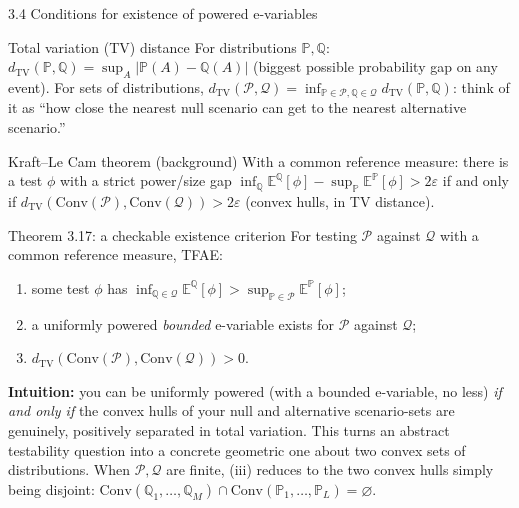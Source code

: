 \documentclass[aspectratio=169,10pt]{beamer}
\newcommand{\PP}{\mathbb{P}}
\newcommand{\QQ}{\mathbb{Q}}
\newcommand{\EE}{\mathbb{E}}
\newcommand{\calP}{\mathcal{P}}
\newcommand{\calQ}{\mathcal{Q}}
\begin{document}
\begin{frame}[allowframebreaks]{3.4 Conditions for existence of powered e-variables}
  \begin{block}{Total variation (TV) distance}
    For distributions $\PP,\QQ$: $d_{\mathrm{TV}}(\PP,\QQ) = \sup_A |\PP(A)-\QQ(A)|$ (biggest possible probability gap on any event). For sets of distributions, $d_{\mathrm{TV}}(\calP,\calQ) = \inf_{\PP\in\calP,\QQ\in\calQ} d_{\mathrm{TV}}(\PP,\QQ)$: think of it as ``how close the nearest null scenario can get to the nearest alternative scenario.''
  \end{block}

  \begin{block}{Kraft--Le Cam theorem (background)}
    With a common reference measure: there is a test $\phi$ with a strict power/size gap $\inf_\QQ \EE^\QQ[\phi] - \sup_\PP\EE^\PP[\phi] > 2\varepsilon$ if and only if $d_{\mathrm{TV}}(\mathrm{Conv}(\calP),\mathrm{Conv}(\calQ)) > 2\varepsilon$ (convex hulls, in TV distance).
  \end{block}

  \begin{block}{Theorem 3.17: a checkable existence criterion}
    For testing $\calP$ against $\calQ$ with a common reference measure, TFAE:
    \begin{enumerate}
      \item[(i)] some test $\phi$ has $\inf_{\QQ\in\calQ}\EE^\QQ[\phi] > \sup_{\PP\in\calP}\EE^\PP[\phi]$;
      \item[(ii)] a uniformly powered \emph{bounded} e-variable exists for $\calP$ against $\calQ$;
      \item[(iii)] $d_{\mathrm{TV}}(\mathrm{Conv}(\calP),\mathrm{Conv}(\calQ)) > 0$.
    \end{enumerate}
  \end{block}

  \textbf{Intuition:} you can be uniformly powered (with a bounded e-variable, no less) \emph{if and only if} the convex hulls of your null and alternative scenario-sets are genuinely, positively separated in total variation. This turns an abstract testability question into a concrete geometric one about two convex sets of distributions. When $\calP,\calQ$ are finite, (iii) reduces to the two convex hulls simply being disjoint: $\mathrm{Conv}(\QQ_1,\dots,\QQ_M)\cap\mathrm{Conv}(\PP_1,\dots,\PP_L)=\varnothing$.
\end{frame}
\end{document}
